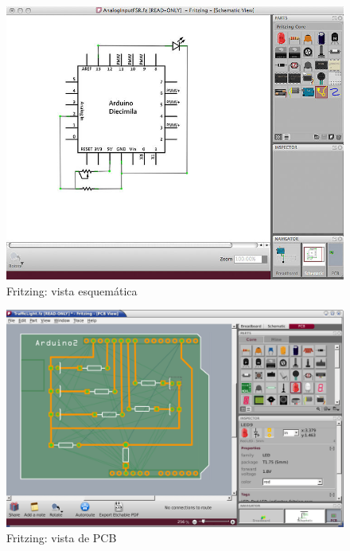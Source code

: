  \begin{figure}
  \centering
  \includegraphics[scale=0.3,keepaspectratio=true]{./imagenes/fritzing-esquema.jpg}
  \caption{Fritzing: vista esquemática}
  \label{figura:FritzingEsquema}
 \end{figure}

 \begin{figure}
  \centering
  \includegraphics[scale=0.3,keepaspectratio=true]{./imagenes/fritzing-pcb.png}
  \caption{Fritzing: vista de PCB}
  \label{figura:FritzingPCB}
 \end{figure}

